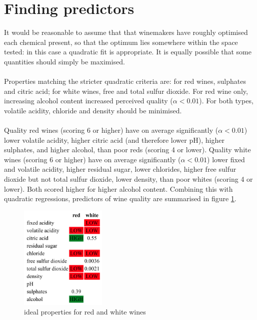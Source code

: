 \documentclass{article}
\begin{document}
\section*{Finding predictors}
It would be reasonable to assume that that winemakers have roughly optimised each chemical present, so that the optimum lies somewhere within the space 
tested: in this case a quadratic fit is appropriate.  It is equally possible that some quantities should simply be maximised.
\\~\\
Properties matching the stricter quadratic criteria are: for red wines, sulphates and citric acid; 
for white wines, free and total sulfur dioxide.  For red wine only, increasing alcohol content increased perceived quality ($\alpha < 0.01$).  
For both types, volatile acidity, chloride and density should be minimised.
\\~\\
Quality red wines (scoring 6 or higher) have on average significantly ($\alpha < 0.01$) lower volatile acidity, higher citric acid (and therefore lower pH),
higher sulphates, and higher alcohol, than poor reds (scoring 4 or lower).\linebreak
Quality white wines (scoring 6 or higher) have on average significantly ($\alpha < 0.01$) lower fixed and volatile acidity, higher residual sugar, lower chlorides, higher free sulfur dioxide but not total sulfur dioxide, lower density, than poor whites (scoring 4 or lower).\linebreak
Both scored higher for higher alcohol content.  Combining this with quadratic regressions, predictors of wine quality are
summarised in figure \ref{fig:recipe}.

\begin{figure}[h]
\centering
\includegraphics[height=5.0cm]{figures/recipe.png}
\caption{ideal properties for red and white wines}
\label{fig:recipe}
\end{figure}
\end{document}
